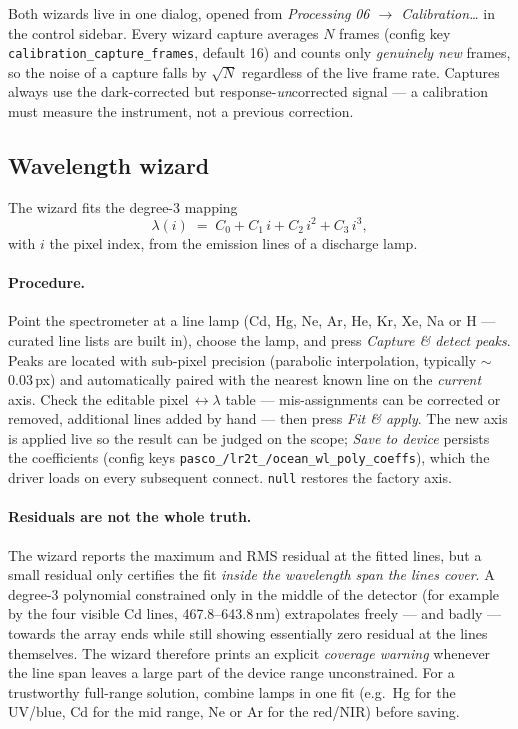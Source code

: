 Both wizards live in one dialog, opened from \emph{Processing\,\textperiodcentered\,06
$\to$ Calibration\ldots} in the control sidebar. Every wizard capture averages
$N$ frames (config key \texttt{calibration\_capture\_frames}, default 16) and
counts only \emph{genuinely new} frames, so the noise of a capture falls by
$\sqrt{N}$ regardless of the live frame rate. Captures always use the
dark-corrected but response-\emph{un}corrected signal --- a calibration must
measure the instrument, not a previous correction.

\subsection{Wavelength wizard}
\label{sec:cal-wavelength}

The wizard fits the degree-3 mapping
\[
  \lambda(i) \;=\; C_0 + C_1\,i + C_2\,i^{2} + C_3\,i^{3},
\]
with $i$ the pixel index, from the emission lines of a discharge lamp.

\paragraph{Procedure.}
Point the spectrometer at a line lamp (Cd, Hg, Ne, Ar, He, Kr, Xe, Na or H ---
curated line lists are built in), choose the lamp, and press
\emph{Capture \& detect peaks}. Peaks are located with sub-pixel precision
(parabolic interpolation, typically $\sim$0.03\,px) and automatically paired
with the nearest known line on the \emph{current} axis. Check the editable
pixel\,$\leftrightarrow\lambda$ table --- mis-assignments can be corrected or
removed, additional lines added by hand --- then press \emph{Fit \& apply}.
The new axis is applied live so the result can be judged on the scope;
\emph{Save to device} persists the coefficients (config keys
\texttt{pasco\_/lr2t\_/ocean\_wl\_poly\_coeffs}), which the driver loads on
every subsequent connect. \texttt{null} restores the factory axis.

\paragraph{Residuals are not the whole truth.}
The wizard reports the maximum and RMS residual at the fitted lines, but a
small residual only certifies the fit \emph{inside the wavelength span the
lines cover}. A degree-3 polynomial constrained only in the middle of the
detector (for example by the four visible Cd lines, 467.8--643.8\,nm)
extrapolates freely --- and badly --- towards the array ends while still
showing essentially zero residual at the lines themselves. The wizard
therefore prints an explicit \emph{coverage warning} whenever the line span
leaves a large part of the device range unconstrained. For a trustworthy
full-range solution, combine lamps in one fit (e.g.\ Hg for the UV/blue, Cd
for the mid range, Ne or Ar for the red/NIR) before saving.

